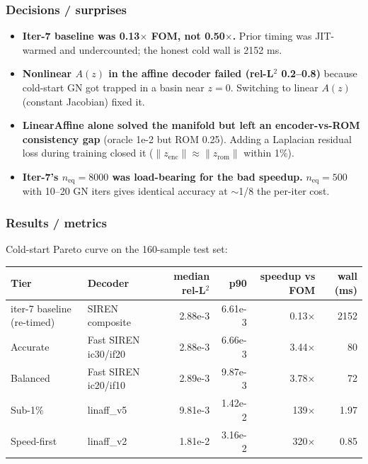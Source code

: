 \subsubsection*{Decisions / surprises}
\begin{itemize}
  \item \textbf{Iter-7 baseline was 0.13$\times$ FOM, not 0.50$\times$.}
        Prior timing was JIT-warmed and undercounted; the honest cold
        wall is 2152 ms.
  \item \textbf{Nonlinear $A(z)$ in the affine decoder failed
        (rel-L$^2$ 0.2--0.8)} because cold-start GN got trapped in a
        basin near $z{=}0$. Switching to linear $A(z)$ (constant
        Jacobian) fixed it.
  \item \textbf{LinearAffine alone solved the manifold but left an
        encoder-vs-ROM consistency gap} (oracle 1e-2 but ROM 0.25).
        Adding a Laplacian residual loss during training closed it
        ($\|z_{\text{enc}}\| \approx \|z_{\text{rom}}\|$ within 1\%).
  \item \textbf{Iter-7's $n_{\text{eq}}{=}8000$ was load-bearing for the
        bad speedup.} $n_{\text{eq}}{=}500$ with 10--20 GN iters gives
        identical accuracy at $\sim$1/8 the per-iter cost.
\end{itemize}

\subsubsection*{Results / metrics}

Cold-start Pareto curve on the 160-sample test set:

\begin{center}
\begin{tabular}{l l r r r r}
  \textbf{Tier} & \textbf{Decoder} & \textbf{median rel-L$^2$} & \textbf{p90} & \textbf{speedup vs FOM} & \textbf{wall (ms)} \\
  \hline
  iter-7 baseline (re-timed) & SIREN composite       & 2.88e-3 & 6.61e-3 & 0.13$\times$ & 2152 \\
  Accurate                   & Fast SIREN ic30/if20  & 2.88e-3 & 6.66e-3 & 3.44$\times$ & 80   \\
  Balanced                   & Fast SIREN ic20/if10  & 2.89e-3 & 9.87e-3 & 3.78$\times$ & 72   \\
  Sub-1\%                    & linaff\_v5            & 9.81e-3 & 1.42e-2 & 139$\times$  & 1.97 \\
  Speed-first                & linaff\_v2            & 1.81e-2 & 3.16e-2 & 320$\times$  & 0.85 \\
\end{tabular}
\end{center}

